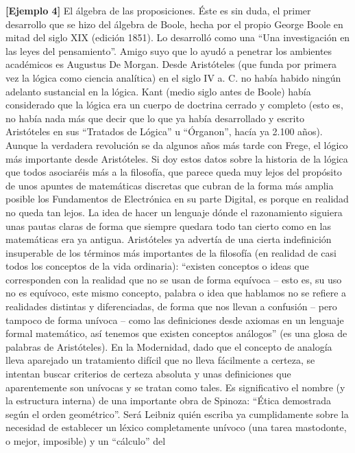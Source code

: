 \documentclass[
]{article}
\begin{document}
\begin{enumerate}
  \textbf{{[}Ejemplo 4{]}} El álgebra de las proposiciones. Éste es sin
  duda, el primer desarrollo que se hizo del álgebra de Boole, hecha por
  el propio George Boole en mitad del siglo XIX (edición 1851). Lo
  desarrolló como una ``Una investigación en las leyes del
  pensamiento''. Amigo suyo que lo ayudó a penetrar los ambientes
  académi\-cos es Augustus De Morgan. Desde Aristóteles (que funda por
  primera vez la ló\-gica como ciencia analítica) en el siglo IV a. C.
  no había habido ningún adelanto sustancial en la lógica. Kant (medio
  siglo antes de Boole) había considerado que la lógica era un cuerpo de
  doctrina cerrado y completo (esto es, no había nada más que decir que
  lo que ya había desarrollado y escrito Aristóteles en sus ``Tra\-tados
  de Lógica'' u ``Órganon'', hacía ya 2.100 años). Aunque la verdadera
  revolu\-ción se da algunos años más tarde con Frege, el lógico más
  importante desde Aristóteles. Si doy estos datos sobre la historia de
  la lógica que todos asociaréis más a la filosofía, que parece queda
  muy lejos del propósito de unos apuntes de matemáticas discretas que
  cubran de la forma más amplia posible los Fundamentos de Electrónica
  en su parte Digital, es porque en realidad no queda tan lejos. La idea
  de hacer un lenguaje dónde el razonamiento siguiera unas pautas claras
  de forma que siempre quedara todo tan cierto como en las matemáticas
  era ya antigua. Aristóteles ya advertía de una cierta indefinición
  insuperable de los términos más importantes de la filosofía (en
  realidad de casi todos los conceptos de la vida ordinaria): ``existen
  conceptos o ideas que corresponden con la realidad que no se usan de
  forma equívoca -- esto es, su uso no es equívoco, este mismo concepto,
  palabra o idea que hablamos no se refiere a realidades distintas y
  diferenciadas, de forma que nos llevan a confusión -- pero tampoco de
  forma unívoca -- como las definiciones desde axiomas en un lenguaje
  formal matemático, así tenemos que existen conceptos análogos'' (es
  una glosa de palabras de Aristóteles). En la Modernidad, dado que el
  concepto de analogía lleva aparejado un tratamiento difícil que no
  lleva fácilmente a certeza, se intentan buscar criterios de certeza
  absoluta y unas definiciones que aparentemente son unívocas y se
  tratan como tales. Es significativo el nombre (y la estructura
  interna) de una importante obra de Spino\-za: ``Ética demostrada según
  el orden geométrico''. Será Leibniz quién escriba ya cumplidamente
  sobre la necesidad de establecer un léxico completamente unívoco (una
  tarea mastodonte, o mejor, imposible) y un ``cálculo'' del

\end{enumerate}
\end{document}
